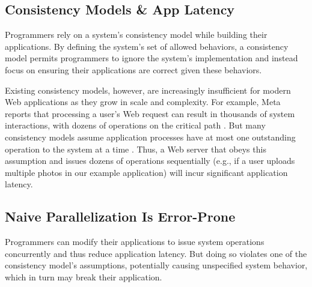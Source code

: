 
\subsection{Consistency Models \& App Latency}

Programmers rely on a system's consistency model while building their applications. By defining the system's set of allowed behaviors, a consistency model permits programmers to ignore the system's implementation and instead focus on ensuring their applications are correct given these behaviors.


Existing consistency models, however, are increasingly insufficient for modern Web applications as they grow in scale and complexity. For example, Meta reports that processing a user's Web request can result in thousands of system interactions, with dozens of operations on the critical path \cite{ajoux2015challenges,dean2013tail}. But many consistency models assume application processes have at most one outstanding operation to the system at a time \cite{ahamad1995causal,herlihy1990linearizability}. Thus, a Web server that obeys this assumption and issues dozens of operations sequentially
(e.g., if a user uploads multiple photos in our example application)
will incur significant application latency.

\subsection{Naive Parallelization Is Error-Prone}

Programmers can modify their applications to issue system operations concurrently
and thus reduce application latency. But doing so violates one of the consistency
model's assumptions, potentially causing unspecified system behavior,
which in turn may break their application.

